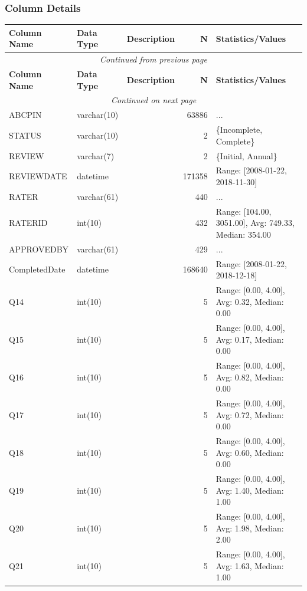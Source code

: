 \begin{landscape}
\subsubsection{Column Details}
\begin{longtable}{|l|l|l|r|p{6cm}|}
\hline
\textbf{Column Name} & \textbf{Data Type} & \textbf{Description} & \textbf{N} & \textbf{Statistics/Values} \\
\hline
\endfirsthead
\multicolumn{5}{c}{\textit{Continued from previous page}} \\
\hline
\textbf{Column Name} & \textbf{Data Type} & \textbf{Description} & \textbf{N} & \textbf{Statistics/Values} \\
\hline
\endhead
\hline
\multicolumn{5}{c}{\textit{Continued on next page}} \\
\endfoot
\hline
\endlastfoot
ABCPIN & varchar(10) &  & 63886 & ... \\
\hline
STATUS & varchar(10) &  & 2 & \{Incomplete, Complete\} \\
\hline
REVIEW & varchar(7) &  & 2 & \{Initial, Annual\} \\
\hline
REVIEWDATE & datetime &  & 171358 & Range: [2008-01-22, 2018-11-30] \\
\hline
RATER & varchar(61) &  & 440 & ... \\
\hline
RATERID & int(10) &  & 432 & Range: [104.00, 3051.00], Avg: 749.33, Median: 354.00 \\
\hline
APPROVEDBY & varchar(61) &  & 429 & ... \\
\hline
CompletedDate & datetime &  & 168640 & Range: [2008-01-22, 2018-12-18] \\
\hline
Q14 & int(10) &  & 5 & Range: [0.00, 4.00], Avg: 0.32, Median: 0.00 \\
\hline
Q15 & int(10) &  & 5 & Range: [0.00, 4.00], Avg: 0.17, Median: 0.00 \\
\hline
Q16 & int(10) &  & 5 & Range: [0.00, 4.00], Avg: 0.82, Median: 0.00 \\
\hline
Q17 & int(10) &  & 5 & Range: [0.00, 4.00], Avg: 0.72, Median: 0.00 \\
\hline
Q18 & int(10) &  & 5 & Range: [0.00, 4.00], Avg: 0.60, Median: 0.00 \\
\hline
Q19 & int(10) &  & 5 & Range: [0.00, 4.00], Avg: 1.40, Median: 1.00 \\
\hline
Q20 & int(10) &  & 5 & Range: [0.00, 4.00], Avg: 1.98, Median: 2.00 \\
\hline
Q21 & int(10) &  & 5 & Range: [0.00, 4.00], Avg: 1.63, Median: 1.00 \\

\end{longtable}
\end{landscape}
